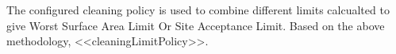 The configured cleaning policy is used to combine different limits calcualted to give Worst Surface Area Limit Or Site Acceptance Limit. Based on the above methodology, <<cleaningLimitPolicy>>.\relax